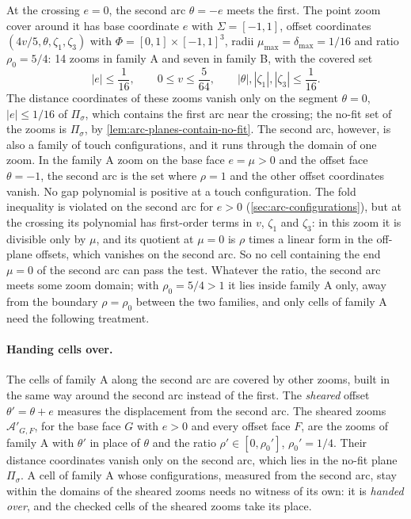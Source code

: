 At the crossing $e=0$, the second arc $\theta=-e$ meets the first. The point
zoom cover around it has base coordinate $e$ with $\Sigma=[-1,1]$, offset
coordinates $(4v/5,\theta,\zeta_1,\zeta_3)$ with $\Phi=[0,1]\times{[-1,1]}^3$,
radii $\mu_{\max}=\delta_{\max}=1/16$ and ratio $\rho_0=5/4$: 14 zooms in
family A and seven in family B, with the covered set
\[
  |e|\le\frac1{16},\qquad 0\le v\le\frac5{64},\qquad
  |\theta|,|\zeta_1|,|\zeta_3|\le\frac1{16}.
\]
The distance coordinates of these zooms vanish only on the segment
$\theta=0$, $|e|\le1/16$ of $\Pi_\sigma$, which contains the first arc near
the crossing; the no-fit set of the zooms is $\Pi_\sigma$, by
\cref{lem:arc-planes-contain-no-fit}. The second arc, however, is also a
family of touch configurations, and it runs through the domain of one
zoom. In the family A zoom on the base face
$e=\mu>0$ and the offset face $\theta=-1$, the second arc is the set where
$\rho=1$ and the other offset coordinates vanish. No gap polynomial is
positive at a touch configuration. The fold inequality is violated on the
second arc for $e>0$ (\cref{sec:arc-configurations}), but at the crossing its
polynomial has first-order terms in $v$, $\zeta_1$ and $\zeta_3$: in this zoom
it is divisible only by $\mu$, and its quotient at $\mu=0$ is $\rho$ times a
linear form in the off-plane offsets, which vanishes on the second arc. So
no cell containing the end $\mu=0$ of the second arc can pass the test. Whatever the ratio, the second arc meets some zoom domain;
with $\rho_0=5/4>1$ it lies inside family A only, away from the boundary
$\rho=\rho_0$ between the two families, and only cells of family A need
the following treatment.

\paragraph{Handing cells over.}
The cells of family A along the second arc are covered by other zooms,
built in the same way around the second arc instead of the first. The
\emph{sheared} offset $\theta'=\theta+e$ measures the displacement from the
second arc. The sheared zooms $\mathcal A'_{G,F}$, for the base face $G$
with $e>0$ and every offset face $F$, are the zooms of family A with
$\theta'$ in place of $\theta$ and the ratio $\rho'\in[0,\rho_0']$,
$\rho_0'=1/4$. Their distance coordinates vanish only on the second arc,
which lies in the no-fit plane $\Pi_\sigma$. A cell of family A whose
configurations, measured from the second arc, stay within the domains of
the sheared zooms needs no witness of its own: it is \emph{handed over},
and the checked cells of the sheared zooms take its place.


